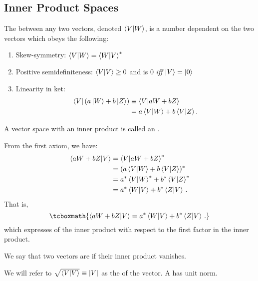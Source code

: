 
\subsection{Inner Product Spaces}

\begin{shaded*}
The  between any two vectors, denoted $\braket{V}{W}$, is a number dependent on the two vectors which obeys the following:
\begin{enumerate}
    \item Skew-symmetry: $\braket{V}{W} = \braket{W}{V}^*$
    \item Positive semidefiniteness: $\braket{V} \geq 0$ and is 0 \textit{iff} $\ket{V} = \ket{0}$
    \item Linearity in ket:
    \begin{align}
        \bra{V} (a\ket{W} + b\ket{Z}) &\equiv \braket{V}{aW + bZ} \\
        &= a\braket{V}{W} + b\braket{V}{Z}.
    \end{align}
\end{enumerate}
\end{shaded*}

A vector space with an inner product is called an .

From the first axiom, we have:
\begin{align}\label{antilinearity in bra}
    \braket{aW + bZ}{V} &= \braket{V}{aW + bZ}^*\\
    &= (a\braket{V}{W} + b\braket{V}{Z})^*\\
    &= a^*\braket{V}{W}^* + b^*\braket{V}{Z}^*\\
    &= a^*\braket{W}{V} + b^*\braket{Z}{V}\,.
\end{align}
That is,
\begin{equation}
\tcboxmath{\braket{aW + bZ}{V} = a^*\braket{W}{V} + b^*\braket{Z}{V}\,.}
\end{equation}
which expresses  of the inner product with respect to the first factor in the inner product.

We say that two vectors are  if their inner product vanishes.

We will refer to $\sqrt{\braket{V}} \equiv |V|$ as the  of the vector. A  has unit norm.


